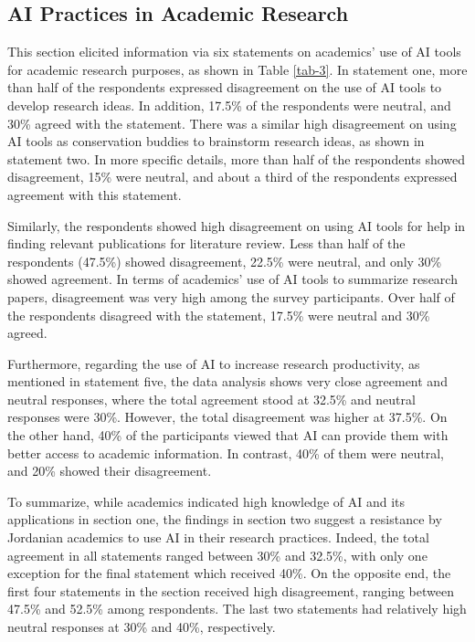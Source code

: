 \documentclass[english]{textolivre}
\begin{document}
\subsection{AI Practices in Academic Research}

This section elicited information via six statements on academics’ use of AI tools for academic research purposes, as shown in Table \ref{tab-3}. In statement one, more than half of the respondents expressed disagreement on the use of AI tools to develop research ideas. In addition, 17.5\% of the respondents were neutral, and 30\% agreed with the statement. There was a similar high disagreement on using AI tools as conservation buddies to brainstorm research ideas, as shown in statement two. In more specific details, more than half of the respondents showed disagreement, 15\% were neutral, and about a third of the respondents expressed agreement with this statement.

Similarly, the respondents showed high disagreement on using AI tools for help in finding relevant publications for literature review. Less than half of the respondents (47.5\%) showed disagreement, 22.5\% were neutral, and only 30\% showed agreement. In terms of academics’ use of AI tools to summarize research papers, disagreement was very high among the survey participants. Over half of the respondents disagreed with the statement, 17.5\% were neutral and 30\% agreed.

Furthermore, regarding the use of AI to increase research productivity, as mentioned in statement five, the data analysis shows very close agreement and neutral responses, where the total agreement stood at 32.5\% and neutral responses were 30\%. However, the total disagreement was higher at 37.5\%. On the other hand, 40\% of the participants viewed that AI can provide them with better access to academic information. In contrast, 40\% of them were neutral, and 20\% showed their disagreement.

To summarize, while academics indicated high knowledge of AI and its applications in section one, the findings in section two suggest a resistance by Jordanian academics to use AI in their research practices. Indeed, the total agreement in all statements ranged between 30\% and 32.5\%, with only one exception for the final statement which received 40\%. On the opposite end, the first four statements in the section received high disagreement, ranging between 47.5\% and 52.5\% among respondents. The last two statements had relatively high neutral responses at 30\% and 40\%, respectively.
\end{document}
